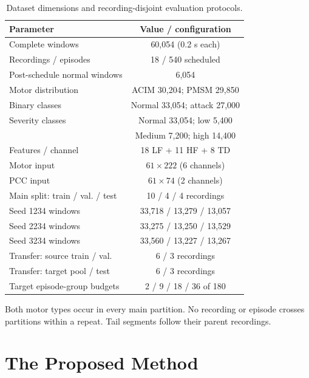 \documentclass[letterpaper,journal]{IEEEtran}
\begin{document}
\begin{table}[t]
\centering
\footnotesize
\caption{Dataset dimensions and recording-disjoint evaluation protocols.}
\label{tab:evaluation_protocols}
\renewcommand{\arraystretch}{1.12}
\setlength{\tabcolsep}{3pt}
\begin{tabular}{lc}
\hline
Parameter & Value / configuration \\
\hline
Complete windows & 60,054 (0.2 s each) \\
Recordings / episodes & 18 / 540 scheduled \\
Post-schedule normal windows & 6,054 \\
Motor distribution & ACIM 30,204; PMSM 29,850 \\
Binary classes & Normal 33,054; attack 27,000 \\
Severity classes & Normal 33,054; low 5,400 \\
 & Medium 7,200; high 14,400 \\
Features / channel & 18 LF + 11 HF + 8 TD \\
Motor input & $61\times222$ (6 channels) \\
PCC input & $61\times74$ (2 channels) \\
Main split: train / val. / test & 10 / 4 / 4 recordings \\
Seed 1234 windows & 33,718 / 13,279 / 13,057 \\
Seed 2234 windows & 33,275 / 13,250 / 13,529 \\
Seed 3234 windows & 33,560 / 13,227 / 13,267 \\
Transfer: source train / val. & 6 / 3 recordings \\
Transfer: target pool / test & 6 / 3 recordings \\
Target episode-group budgets & 2 / 9 / 18 / 36 of 180 \\
\hline
\end{tabular}
\par\smallskip\begin{minipage}{\linewidth}\footnotesize Both motor types occur in every main partition. No recording or episode crosses partitions within a repeat. Tail segments follow their parent recordings.\end{minipage}
\end{table}

\section{The Proposed Method}
\label{sec:method}
\end{document}
